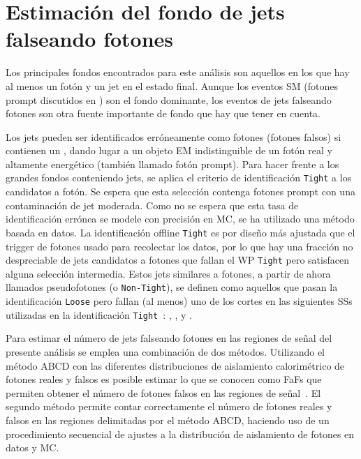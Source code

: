 \section{Estimación del fondo de jets falseando fotones}
\label{sec:bkg:estimation}

Los principales fondos encontrados para este análisis son aquellos en los que hay al menos un fotón y un jet en el estado final. Aunque los eventos \ac{SM} \gammajet (fotones prompt discutidos en \Sect{\ref{subsec:theory:sm:prompt_photon}}) son el fondo dominante, los eventos de jets falseando fotones son otra fuente importante de fondo que hay que tener en cuenta.




Los jets pueden ser identificados erróneamente como fotones (fotones falsos) si contienen un \pizero, dando lugar a un objeto \ac{EM} indistinguible de un fotón real y altamente energético (también llamado fotón prompt). Para hacer frente a los grandes fondos conteniendo jets, se aplica el criterio de identificación \texttt{Tight} a los candidatos a fotón. Se espera que esta selección contenga fotones prompt con una contaminación de jet moderada. Como no se espera que esta tasa de identificación errónea se modele con precisión en \ac{MC}, se ha utilizado una método basada en datos. La identificación offline \texttt{Tight} es por diseño más ajustada que el trigger de fotones usado para recolectar los datos, por lo que hay una fracción no despreciable de jets candidatos a fotones que fallan el \ac{WP} \texttt{Tight} pero satisfacen alguna selección intermedia. Estos jets similares a fotones, a partir de ahora llamados pseudofotones (o \texttt{Non-Tight}), se definen como aquellos que pasan la identificación \texttt{Loose} pero fallan (al menos) uno de los cortes en las siguientes \acp{SS} utilizadas en la identificación \texttt{Tight}~\cite{ATLAS-EGamma-Performance-2015-2017}: \wone, \fside, \deltae y \eratio.

Para estimar el número de jets falseando fotones en las regiones de señal del presente análisis se emplea una combinación de dos métodos. Utilizando el método ABCD con las diferentes distribuciones de aislamiento calorimétrico de fotones reales y falsos es posible estimar lo que se conocen como \acp{FaF} que permiten obtener el número de fotones falsos en las regiones de señal~\cite{ATLAS-SUSY-PhotonMetX-13TeV,ATLAS-SUSY-PhotonMetX-13TeV-NOTE,ATLAS-SUSY-PhotonJetMet-13TeV,ATLAS-SUSY-PhotonJetMet-13TeV-NOTE}. El segundo método permite contar correctamente el número de fotones reales y falsos en las regiones delimitadas por el método ABCD, haciendo uso de un procedimiento secuencial de ajustes a la distribución de aislamiento de fotones en datos y \ac{MC}.


